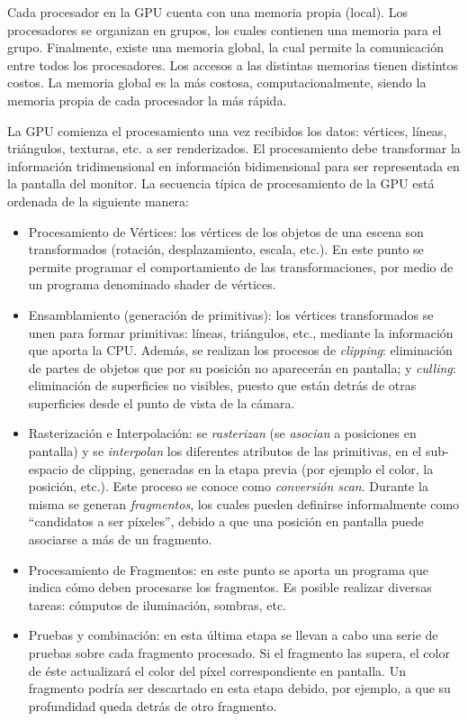 Cada procesador en la GPU cuenta con una memoria propia (local).
Los procesadores se organizan en grupos, los cuales contienen una memoria para el grupo.
Finalmente, existe una memoria global, la cual permite la comunicación entre todos los procesadores.
Los accesos a las distintas memorias tienen distintos costos.
La memoria global es la más costosa, computacionalmente, siendo la memoria propia de cada procesador la más rápida.

La GPU comienza el procesamiento una vez recibidos los datos: vértices, líneas, triángulos, texturas, etc. a ser renderizados.
El procesamiento debe transformar la información tridimensional en información bidimensional para ser representada en la pantalla del monitor.
La secuencia t\'ipica de procesamiento de la GPU est\'a ordenada de la siguiente manera:
\begin{itemize}
\item Procesamiento de V\'ertices: los v\'ertices de los objetos de una escena son transformados (rotación, desplazamiento, escala, etc.).
En este punto se permite programar el comportamiento de las transformaciones, por medio de un programa denominado shader de vértices.
\item Ensamblamiento (generación de primitivas): los v\'ertices transformados se unen para formar primitivas: l\'ineas, tri\'angulos, etc., mediante la informaci\'on que aporta la CPU.
Además, se realizan los procesos de {\em clipping}: eliminaci\'on de partes de objetos que por su posici\'on no aparecer\'an en pantalla; y {\em culling}: eliminaci\'on de superficies no visibles, puesto que est\'an detr\'as de otras superficies desde el punto de vista de la c\'amara.
\item Rasterización e Interpolaci\'on: se {\em rasterizan} (se {\em asocian} a posiciones en pantalla) y se {\em interpolan} los diferentes atributos de las primitivas, en el sub-espacio de clipping, generadas en la etapa previa (por ejemplo el color, la posición, etc.).
Este proceso se conoce como {\em conversi\'on scan}.
Durante la misma se generan {\em fragmentos}, los cuales pueden definirse informalmente como ``candidatos a ser p\'ixeles'', debido a que una posición en pantalla puede asociarse a más de un fragmento.
\item Procesamiento de Fragmentos: en este punto se aporta un programa que indica cómo deben procesarse los fragmentos.
Es posible realizar diversas tareas: cómputos de iluminación, sombras, etc.
\item Pruebas y combinación: en esta \'ultima etapa se llevan a cabo una serie de pruebas sobre cada fragmento procesado.
Si el fragmento las supera, el color de éste actualizará el color del píxel correspondiente en pantalla.
Un fragmento podría ser descartado en esta etapa debido, por ejemplo, a que su profundidad queda detrás de otro fragmento.
\end{itemize}

